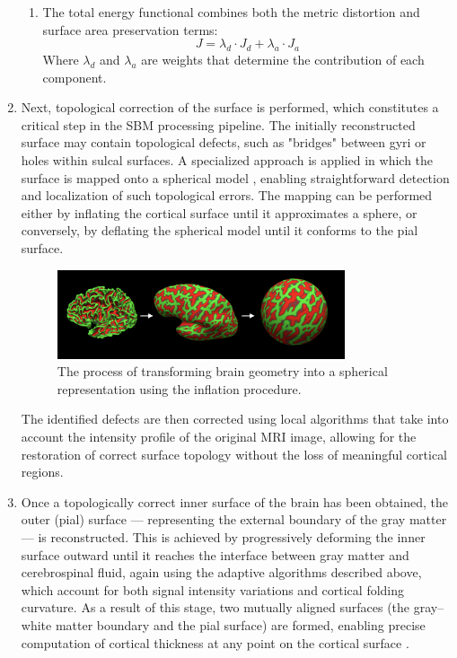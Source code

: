 \documentclass[default]{subfiles}
\begin{document}
\begin{enumerate}
\begin{enumerate}
        \item The total energy functional combines both the metric distortion and surface area preservation terms:
        $$J = \lambda_d \cdot J_d + \lambda_a \cdot J_a$$
        Where $\lambda_d$ and $\lambda_a$ are weights that determine the contribution of each component.
    \end{enumerate}

    \item Next, topological correction of the surface is performed, which constitutes a critical step in the SBM
    processing pipeline. The initially reconstructed surface may contain topological defects, such as "bridges"
    between gyri or holes within sulcal surfaces. A specialized approach is applied in which the surface is mapped onto
    a spherical model \cite{fischl_1999}, enabling straightforward detection and localization of such topological
    errors. The mapping can be performed either by inflating the cortical surface until it approximates a sphere, or
    conversely, by deflating the spherical model until it conforms to the pial surface.

    \begin{figure}[H]
        \centering
        \includegraphics[width=0.8\textwidth]{image/pic2.png}
        \caption{
          The process of transforming brain geometry into a spherical representation using the inflation procedure.
        }
    \end{figure}

    The identified defects are then corrected using local algorithms that take into account the intensity profile of
    the original MRI image, allowing for the restoration of correct surface topology without the loss of meaningful
    cortical regions.

    \item Once a topologically correct inner surface of the brain has been obtained, the outer (pial) surface —
    representing the external boundary of the gray matter — is reconstructed. This is achieved by progressively
    deforming the inner surface outward until it reaches the interface between gray matter and cerebrospinal fluid,
    again using the adaptive algorithms described above, which account for both signal intensity variations and
    cortical folding curvature. As a result of this stage, two mutually aligned surfaces (the gray–white matter
    boundary and the pial surface) are formed, enabling precise computation of cortical thickness at any point on the
    cortical surface \cite{fischl_2008, fischl_2004}.


\end{enumerate}
\end{document}
